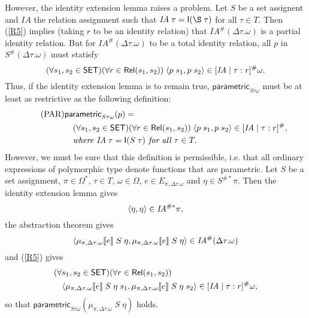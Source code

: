 \documentclass[sigplan,screen,nonacm,balance=false]{acmart}
\makeatletter
\theoremstyle{plain}
\DeclarePairedDelimiter{\pair}{\langle}{\rangle}
\DeclarePairedDelimiter{\interp}{\llbracket}{\rrbracket}
\newcommand{\ie}{i.e.\@\xspace}
\newcommand{\Rel}{\mathsf{Rel}}
\newcommand{\Id}{\mathsf{I}}
\newcommand{\SET}{\mathsf{SET}}
\newcommand{\para}{\mathsf{parametric}}
\newcommand{\IA}{\mathit{IA}}
\makeatother
\begin{document}
However, the identity extension lemma raises a problem.
Let $S$ be a set assignent and $\IA$ the relation assignment such that $\IA \; \tau = \Id(\S \; \tau)$ for all $\tau \in T$.
Then (\ref{R5}) implies (taking $r$ to be an identity relation) that $\IA^\#(\Delta \tau. \omega)$ is a partial identity relation.
But for $\IA^\#(\Delta \tau. \omega)$ to be a total identity relation, all $p$ in $S^\#(\Delta \tau. \omega)$ must statisfy
%
\begin{equation*}
  (\forall s_1, s_2 \in \SET) (\forall r \in \Rel(s_1, s_2)) \; \pair{p \; s_1, p \; s_2} \in [\IA \mid \tau: r]^\# \omega.
\end{equation*}
%
Thus, if the identity extension lemma is to remain true, $\para_{S \tau \omega}$ must be at least as restrictive as the following definition:
%
\begin{align*}\tag{PAR}\label{PAR}
  & \para_{S \tau \omega}(p) = \\
  & \quad (\forall s_1, s_2 \in \SET) (\forall r \in \Rel(s_1, s_2)) \; \pair{p \; s_1, p \; s_2} \in [\IA \mid \tau: r]^\#, \\
  & \quad \textit{where } \IA \; \tau = \Id(S \; \tau) \textit{ for all } \tau \in T.
\end{align*}
%
However, we must be sure that this definition is permissible, \ie that all ordinary expressions of polymorphic type denote functions that are parametric.
Let $S$ be a set assignment, $\pi \in \Omega^*$, $\tau \in T$, $\omega \in \Omega$, $e \in E_{\pi, \Delta \tau. \omega}$ and $\eta \in S^{\#*} \pi$.
Then the identity extension lemma gives
%
\begin{equation*}
  \pair{\eta, \eta} \in \IA^{\#*} \pi,
\end{equation*}
%
the abstraction theorem gives
%
\begin{equation*}
  \pair{\mu_{\pi, \Delta \tau. \omega} \interp{e} \; S \; \eta, \mu_{\pi, \Delta \tau. \omega} \interp{e} \; S \; \eta} \in \IA^\#(\Delta \tau. \omega)
\end{equation*}
%
and (\ref{R5}) gives
%
\begin{align*}
  & (\forall s_1, s_2 \in \SET) (\forall r \in \Rel(s_1, s_2)) \\
  & \quad \pair{\mu_{\pi, \Delta \tau. \omega} \interp{e} \; S \; \eta \; s_1, \mu_{\pi, \Delta \tau. \omega} \interp{e} \; S \; \eta \; s_2} \in [\IA \mid \tau: r] ^\# \omega,
\end{align*}
%
so that $\para_{S \tau \omega}(\mu_{\pi, \Delta \tau. \omega} \; S \; \eta)$ holds.
\end{document}
